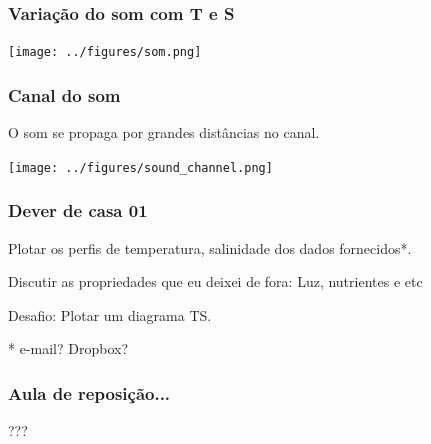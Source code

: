 \begin{frame}
\frametitle{Variação do som com T e S}
    \begin{center}
        \texttt{[image: ../figures/som.png]}
    \end{center}
\end{frame}


\begin{frame}
\frametitle{Canal do som}
  \begin{block}{}
    O som se propaga por grandes distâncias no canal.
  \end{block}

    \begin{center}
        \texttt{[image: ../figures/sound\_channel.png]}
    \end{center}
\end{frame}


\begin{frame}
\frametitle{Dever de casa 01}
  \begin{block}{}
    Plotar os perfis de temperatura, salinidade dos dados fornecidos*.

    Discutir as propriedades que eu deixei de fora: Luz, nutrientes e etc

    Desafio: Plotar um diagrama TS.
    \end{block}

    \pause
    \begin{block}{}
        * e-mail? Dropbox?
    \end{block}
\end{frame}


\begin{frame}
\frametitle{Aula de reposição...}
  \begin{block}{}
    ???
  \end{block}
\end{frame}



